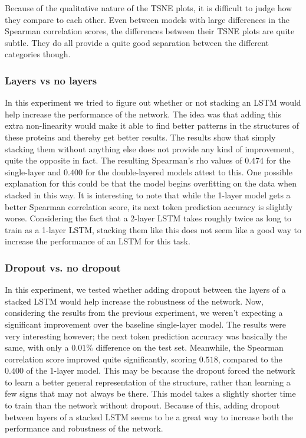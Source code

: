 Because of the qualitative nature of the TSNE plots, it is difficult to judge how they compare to each other. Even between models with large differences in the Spearman correlation scores, the differences between their TSNE plots are quite subtle. They do all provide a quite good separation between the different categories though.
\subsubsection{Layers vs no layers}
In this experiment we tried to figure out whether or not stacking an LSTM would help increase the performance of the network. The idea was that adding this extra non-linearity would make it able to find better patterns in the structures of these proteins and thereby get better results. The results show that simply stacking them without anything else does not provide any kind of improvement, quite the opposite in fact. The resulting Spearman's rho values of $0.474$ for the single-layer and $0.400$ for the double-layered models attest to this. One possible explanation for this could be that the model begins overfitting on the data when stacked in this way. It is interesting to note that while the 1-layer model gets a better Spearman correlation score, its next token prediction accuracy is slightly worse. Considering the fact that a 2-layer LSTM takes roughly twice as long to train as a 1-layer LSTM, stacking them like this does not seem like a good way to increase the performance of an LSTM for this task.

\subsubsection{Dropout vs. no dropout}
In this experiment, we tested whether adding dropout between the layers of a stacked LSTM would help increase the robustness of the network. Now, considering the results from the previous experiment, we weren't expecting a significant improvement over the baseline single-layer model. The results were very interesting however; the next token prediction accuracy was basically the same, with only a $0.01\%$ difference on the test set. Meanwhile, the Spearman correlation score improved quite significantly, scoring $0.518$, compared to the $0.400$ of the 1-layer model. This may be because the dropout forced the network to learn a better general representation of the structure, rather than learning a few signs that may not always be there. This model takes a slightly shorter time to train than the network without dropout. Because of this, adding dropout between layers of a stacked LSTM seems to be a great way to increase both the performance and robustness of the network.

